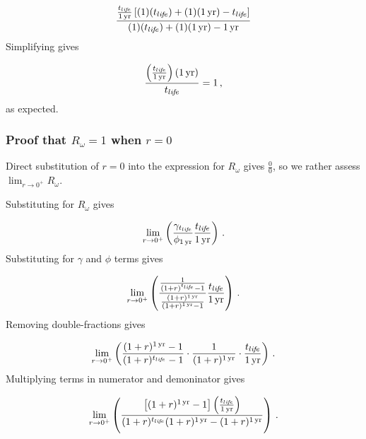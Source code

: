 \begin{equation}
  \frac{\frac{\tlife}{\oneyr}
              \left[ (1) (\tlife) + 
                     (1) (\oneyr) - 
                     \tlife
              \right]}
       {(1) (\tlife) + 
        (1) (\oneyr) - 
        \oneyr}
\end{equation}
%
Simplifying gives

\begin{equation}
  \frac{\left( \frac{t_{li\!f\!e}}{1\,\mathrm{yr}} \right) (1\,\mathrm{yr})}{t_{li\!f\!e}} = 1 \, ,
\end{equation}
%
as expected.



\subsubsection{Proof that $R_\omega = 1$ when $r = 0$}

Direct substitution of $r = 0$ into the expression
for $R_\omega$ gives $\frac{0}{0}$, 
so we rather assess
$\lim_{r \to 0^+} R_\omega$.

Substituting for $R_\omega$ gives

\begin{equation}
  \lim_{r \to 0^+} \left( \frac{\gamma_{t_{li\!f\!e}}}{\phi_{1\,\mathrm{yr}}} \frac{t_{li\!f\!e}}{1\,\mathrm{yr}} \right) \, .
\end{equation}
%
Substituting for $\gamma$ and $\phi$ terms gives

\begin{equation}
  \lim_{r \to 0^+} \left( \frac{\frac{1}{(1 + r)^{t_{li\!f\!e}} - 1}}{\frac{(1 + r)^{1\,\mathrm{yr}}}{(1 + r)^{1\,\mathrm{yr}} - 1}} \frac{t_{li\!f\!e}}{1\,\mathrm{yr}} \right) \, .
\end{equation}
%
Removing double-fractions gives

\begin{equation}
  \lim_{r \to 0^+} \left(
  \frac{(1 + r)^{1\,\mathrm{yr}} - 1}{(1 + r)^{t_{li\!f\!e}} - 1} \cdot
  \frac{1}{(1 + r)^{1\,\mathrm{yr}}} \cdot
  \frac{t_{li\!f\!e}}{1\,\mathrm{yr}}
  \right) \, .
\end{equation}
%
Multiplying terms in numerator and demoninator gives

\begin{equation}
  \lim_{r \to 0^+} 
  \left(
    \frac{\left[ (1 + r)^{1\,\mathrm{yr}} - 1 \right] \left( \frac{t_{li\!f\!e}}{1\,\mathrm{yr}} \right)}
    {(1 + r)^{t_{li\!f\!e}} (1 + r)^{1\,\mathrm{yr}} - (1 + r)^{1\,\mathrm{yr}}} 
  \right) \, .
\end{equation}

